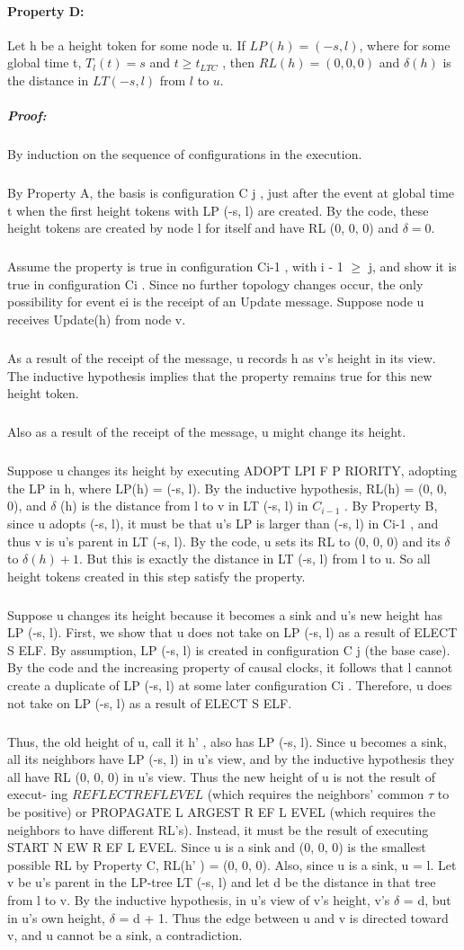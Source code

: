 \paragraph{Property D:}Let h be a height token for some node u. If $LP(h) = (-s, l)$, where for some global time t, $T_l (t) = s$ and $t \geq t_{LTC}$ , then $RL(h) = (0, 0, 0)$ and $\delta (h)$ is the distance in $LT (-s, l)$ from $l$ to $u$.
\subparagraph{Proof:}By induction on the sequence of configurations in the execution.
\subparagraph{}By Property A, the basis is configuration C j , just after the event at global time t when the first height tokens with LP (-s, l) are created. By the code, these height tokens are created by node l for itself and have RL (0, 0, 0) and $\delta = 0$.
\subparagraph{}Assume the property is true in configuration Ci-1 , with i - 1 $\geq$ j, and show it is true in configuration Ci . Since no further topology changes occur, the only possibility for event ei is the receipt of an Update message. Suppose node u receives Update(h) from node v.
\subparagraph{}As a result of the receipt of the message, u records h as v's height in its view. The inductive hypothesis implies that the property remains true for this new height token.
\subparagraph{}Also as a result of the receipt of the message, u might change its height.
\subparagraph{}Suppose u changes its height by executing ADOPT LPI F P RIORITY, adopting the LP in h, where LP(h) = (-s, l). By the inductive hypothesis, RL(h) = (0, 0, 0), and $\delta$ (h) is the distance from l to v in LT (-s, l) in $C_{i-1}$ . By Property B, since u adopts (-s, l), it must be that u's LP is larger than (-s, l) in Ci-1 , and thus v is u's parent in LT (-s, l). By the code, u sets its RL to (0, 0, 0) and its $\delta$ to $\delta (h) + 1$. But this is exactly the distance in LT (-s, l) from l to u. So all height tokens created in this step satisfy the property.
\subparagraph{}Suppose u changes its height because it becomes a sink and u's new height has LP (-s, l). First, we show that u does not take on LP (-s, l) as a result of ELECT S ELF. By assumption, LP (-s, l) is created in configuration C j (the base case). By the code and the increasing property of causal clocks, it follows that l cannot create a duplicate of LP (-s, l) at some later configuration Ci . Therefore, u does not take on LP (-s, l) as a result of ELECT S ELF.
\subparagraph{}Thus, the old height of u, call it h' , also has LP (-s, l). Since u becomes a sink, all its neighbors have LP (-s, l) in u's view, and by the inductive hypothesis they all have RL (0, 0, 0) in u's view. Thus the new height of u is not the result of execut- ing $REFLECTREFLEVEL$ (which requires the neighbors' common $\tau$ to be positive) or PROPAGATE L ARGEST R EF L EVEL (which requires the neighbors to have different RL's). Instead, it must be the result of executing START N EW R EF L EVEL. Since u is a sink and (0, 0, 0) is the smallest possible RL by Property C, RL(h' ) = (0, 0, 0). Also, since u is a sink, u = l. Let v be u's parent in the LP-tree LT (-s, l) and let d be the distance in that tree from l to v. By the inductive hypothesis, in u's view of v's height, v's $\delta$ = d, but in u's own height, $\delta$ = d + 1. Thus the edge between u and v is directed toward v, and u cannot be a sink, a contradiction.
